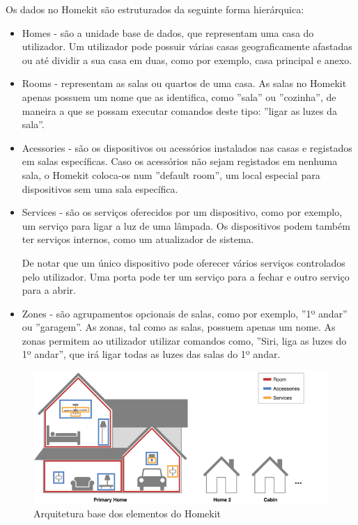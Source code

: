 Os dados no Homekit são estruturados da seguinte forma hierárquica:
\begin{itemize}
    \item Homes - são a unidade base de dados, que representam uma casa do utilizador. Um utilizador pode possuir várias casas geograficamente afastadas ou até dividir a sua casa em duas, como por exemplo, casa principal e anexo.
    
    \item Rooms - representam as salas ou quartos de uma casa. As salas no Homekit apenas possuem um nome que as identifica, como ''sala'' ou ''cozinha'', de maneira a que se possam executar comandos deste tipo: ''ligar as luzes da sala''.
    
    \item Acessories - são os dispositivos ou acessórios instalados nas casas e registados em salas específicas. Caso os acessórios não sejam registados em nenhuma sala, o Homekit coloca-os num ''default room'', um local especial para dispositivos sem uma sala específica.  
    
    \item Services - são os serviços oferecidos por um dispositivo, como por exemplo, um serviço para ligar a luz de uma lâmpada. Os dispositivos podem também ter serviços internos, como um atualizador de sistema.
    
    De notar que um único dispositivo pode oferecer vários serviços controlados pelo utilizador. Uma porta pode ter um serviço para a fechar e outro serviço para a abrir.
    
    \item Zones - são agrupamentos opcionais de salas, como por exemplo, ''1º andar'' ou ''garagem''. As zonas, tal como as salas, possuem apenas um nome. As zonas permitem ao utilizador utilizar comandos como, ''Siri, liga as luzes do 1º andar'', que irá ligar todas as luzes das salas do 1º andar.
\end{itemize}

\begin{figure}[H]
  \centering
        \includegraphics[scale=0.56]{img/homekit-layout.png}
  \caption{Arquitetura base dos elementos do Homekit}
\end{figure}

